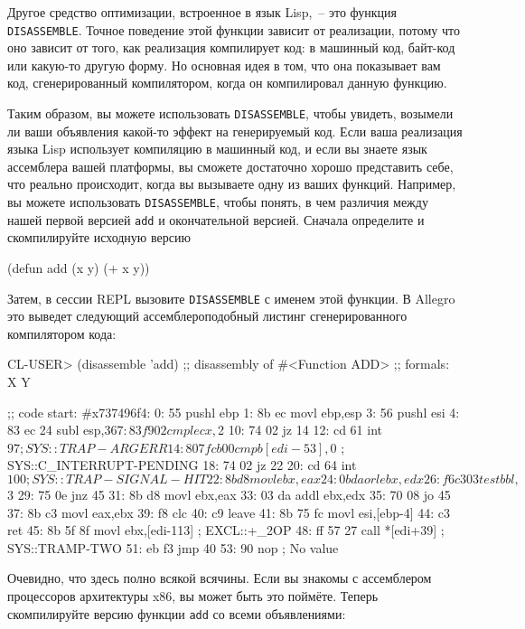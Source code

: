 Другое средство оптимизации, встроенное в язык Lisp,~-- это функция
\lstinline{DISASSEMBLE}. Точное поведение этой функции зависит от реализации, потому что оно
зависит от того, как реализация компилирует код: в машинный код, байт-код или какую-то
другую форму. Но основная идея в том, что она показывает вам код, сгенерированный
компилятором, когда он компилировал данную функцию.

Таким образом, вы можете использовать \lstinline{DISASSEMBLE}, чтобы увидеть, возымели ли ваши
объявления какой-то эффект на генерируемый код. Если ваша реализация языка Lisp использует
компиляцию в машинный код, и если вы знаете язык ассемблера вашей платформы, вы сможете
достаточно хорошо представить себе, что реально происходит, когда вы вызываете одну из
ваших функций. Например, вы можете использовать \lstinline{DISASSEMBLE}, чтобы понять, в чем
различия между нашей первой версией \lstinline{add} и окончательной версией. Сначала определите
и скомпилируйте исходную версию

\begin{myverb}
  (defun add (x y) (+ x y))
\end{myverb}

Затем, в сессии REPL вызовите \lstinline{DISASSEMBLE} с именем этой функции. В Allegro это
выведет следующий ассемблероподобный листинг сгенерированного компилятором кода:

\begin{myverb}
CL-USER> (disassemble 'add)
;; disassembly of #<Function ADD>
;; formals: X Y

;; code start: #x737496f4:
   0: 55         pushl	ebp
   1: 8b ec    movl	ebp,esp
   3: 56         pushl	esi
   4: 83 ec 24 subl	esp,$36
   7: 83 f9 02 cmpl	ecx,$2
  10: 74 02    jz	14
  12: cd 61    int	$97   ; SYS::TRAP-ARGERR
  14: 80 7f cb 00 cmpb	[edi-53],$0        ; SYS::C_INTERRUPT-PENDING
  18: 74 02    jz	22
  20: cd 64    int	$100  ; SYS::TRAP-SIGNAL-HIT
  22: 8b d8    movl	ebx,eax
  24: 0b da    orl	ebx,edx
  26: f6 c3 03 testb	bl,$3
  29: 75 0e    jnz	45
  31: 8b d8    movl	ebx,eax
  33: 03 da    addl	ebx,edx
  35: 70 08    jo	45
  37: 8b c3    movl	eax,ebx
  39: f8         clc
  40: c9         leave
  41: 8b 75 fc movl	esi,[ebp-4]
  44: c3         ret
  45: 8b 5f 8f movl	ebx,[edi-113]    ; EXCL::+_2OP
  48: ff 57 27 call	*[edi+39]   ; SYS::TRAMP-TWO
  51: eb f3    jmp	40
  53: 90         nop
; No value
\end{myverb}

Очевидно, что здесь полно всякой всячины. Если вы знакомы с ассемблером процессоров
архитектуры x86, вы может быть это поймёте. Теперь скомпилируйте версию функции \lstinline{add}
со всеми объявлениями:

